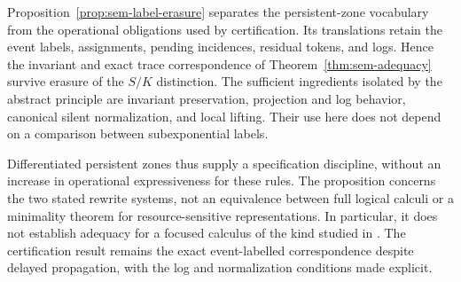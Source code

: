 Proposition~\ref{prop:sem-label-erasure} separates the persistent-zone
vocabulary from the operational obligations used by certification. Its
translations retain the event labels, assignments, pending incidences,
residual tokens, and logs. Hence the invariant and exact trace correspondence
of Theorem~\ref{thm:sem-adequacy} survive erasure of the $S/K$ distinction.
The sufficient ingredients isolated by the abstract principle are invariant
preservation, projection and log behavior, canonical silent normalization,
and local lifting. Their use here does not depend on a comparison between
subexponential labels.

Differentiated persistent zones thus supply a specification discipline,
without an increase in operational expressiveness for these rules. The
proposition concerns the two stated rewrite systems, not an equivalence
between full logical calculi or a minimality theorem for resource-sensitive
representations. In particular, it does not establish adequacy for a focused
calculus of the kind studied in
\cite{Andreoli1992Focusing,NigamMiller2009SELL}. The certification result
remains the exact event-labelled correspondence despite delayed propagation,
with the log and normalization conditions made explicit.
